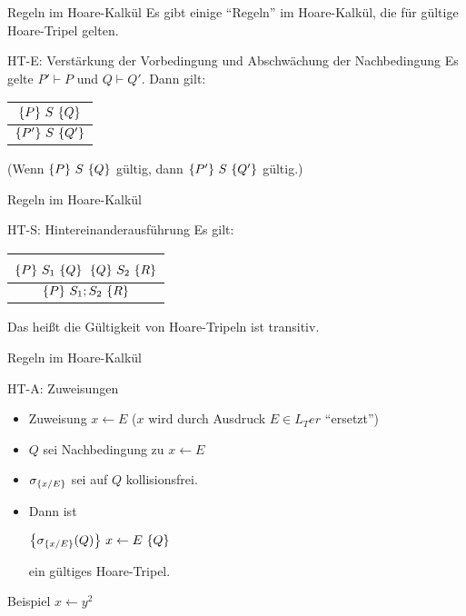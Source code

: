\begin{frame}{Regeln im Hoare-Kalkül}
	Es gibt einige ``Regeln'' im Hoare-Kalkül, die für gültige Hoare-Tripel gelten.

	\begin{block}{HT-E: Verstärkung der Vorbedingung und Abschwächung der Nachbedingung}
		Es gelte $P' \vdash P$ und $Q\vdash Q'$. Dann gilt:
		 \begin{center}\begin{tabular}{c}
						$\left\{ P \right\} \, S \, \left\{ Q \right\}$\\
						\midrule
						$\left\{ P' \right\} \, S \, \left\{ Q' \right\}$
		\end{tabular}\end{center}
		(Wenn $\left\{ P \right\} \, S \, \left\{ Q \right\}$ gültig, dann $\left\{ P' \right\} \, S \, \left\{ Q' \right\}$ gültig.)
	\end{block}

\end{frame}

\begin{frame}{Regeln im Hoare-Kalkül}

	\begin{block}{HT-S: Hintereinanderausführung}
		Es gilt: \begin{center}\begin{tabular}{c}
			$\left\{ P \right\} \, S_1 \, \left\{ Q \right\}$ \qquad $\left\{ Q \right\} \, S_2 \, \left\{ R \right\}$\\
			\midrule
			$\left\{ P \right\} \, S_1 ; S_2 \, \left\{ R \right\}$
		\end{tabular}\end{center}
		Das heißt die Gültigkeit von Hoare-Tripeln ist transitiv. 
		
	\end{block}
\end{frame}

\begin{frame}{Regeln im Hoare-Kalkül}
	\begin{block}{HT-A: Zuweisungen}
		\begin{itemize}
			\item Zuweisung $x \leftarrow E$ ($x$ wird durch Ausdruck $E \in L_Ter$ ``ersetzt'')
			\item $Q$ sei Nachbedingung zu $x \leftarrow E$
			\item $\sigma_{\left\{ x/E \right\}}$ sei auf $Q$ kollisionsfrei.
			\item Dann ist \begin{center}
				$\left\{ \sigma_{\left\{ x/E \right\}}(Q) \right\} \, x\leftarrow E \, \left\{ Q \right\}$
			\end{center} ein gültiges Hoare-Tripel.
		\end{itemize}
	\end{block}
	\pause
	\begin{exampleblock}{Beispiel}
		\only<2>{\HTB{?}\\}
		\only<3>{\HTB{$y^{2}>0$}\\}
		$x \leftarrow y^{2}$\\
	\end{exampleblock}
	
\end{frame}

